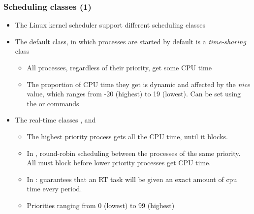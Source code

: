 \begin{frame}
  \frametitle{Scheduling classes (1)}
  \begin{itemize}
  \item The Linux kernel scheduler support different scheduling
    classes
  \item The default class, in which processes are started by default
    is a {\em time-sharing} class
    \begin{itemize}
    \item All processes, regardless of their priority, get some CPU time
    \item The proportion of CPU time they get is dynamic and affected
      by the {\em nice} value, which ranges from -20 (highest) to 19
      (lowest). Can be set using the  or  commands
    \end{itemize}
  \item The real-time classes ,  and
    \begin{itemize}
    \item The highest priority process gets all the CPU time, until it
      blocks.
    \item In , round-robin scheduling between the
      processes of the same priority. All must block before lower
      priority processes get CPU time.
    \item In : guarantees that an RT task
      will be given an exact amount of cpu time every period.
    \item Priorities ranging from 0 (lowest) to 99 (highest)
    \end{itemize}
  \end{itemize}
\end{frame}

